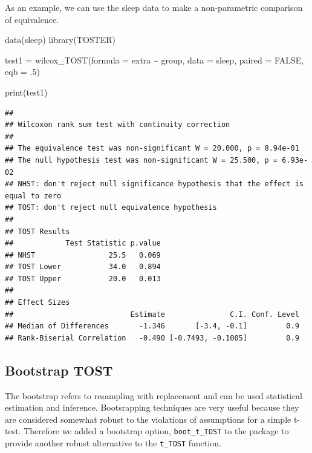 \documentclass[]{interact}
\theoremstyle{plain}%
\theoremstyle{definition}
\theoremstyle{remark}
\newenvironment{Shaded}{\begin{snugshade}}{\end{snugshade}}
\newcommand{\AttributeTok}[1]{\textcolor[rgb]{0.77,0.63,0.00}{#1}}
\newcommand{\ConstantTok}[1]{\textcolor[rgb]{0.00,0.00,0.00}{#1}}
\newcommand{\DecValTok}[1]{\textcolor[rgb]{0.00,0.00,0.81}{#1}}
\newcommand{\FunctionTok}[1]{\textcolor[rgb]{0.00,0.00,0.00}{#1}}
\newcommand{\NormalTok}[1]{#1}
\newcommand{\OtherTok}[1]{\textcolor[rgb]{0.56,0.35,0.01}{#1}}
\newcommand{\SpecialCharTok}[1]{\textcolor[rgb]{0.00,0.00,0.00}{#1}}
\newcommand{\StringTok}[1]{\textcolor[rgb]{0.31,0.60,0.02}{#1}}
\begin{document}
As an example, we can use the sleep data to make a non-parametric
comparison of equivalence.

\begin{Shaded}
\begin{Highlighting}[]
\FunctionTok{data}\NormalTok{(}\StringTok{\textquotesingle{}sleep\textquotesingle{}}\NormalTok{)}
\FunctionTok{library}\NormalTok{(TOSTER)}

\NormalTok{test1 }\OtherTok{=} \FunctionTok{wilcox\_TOST}\NormalTok{(}\AttributeTok{formula =}\NormalTok{ extra }\SpecialCharTok{\textasciitilde{}}\NormalTok{ group,}
                      \AttributeTok{data =}\NormalTok{ sleep,}
                      \AttributeTok{paired =} \ConstantTok{FALSE}\NormalTok{,}
                      \AttributeTok{eqb =}\NormalTok{ .}\DecValTok{5}\NormalTok{)}


\FunctionTok{print}\NormalTok{(test1)}
\end{Highlighting}
\end{Shaded}

\begin{verbatim}
## 
## Wilcoxon rank sum test with continuity correction
## 
## The equivalence test was non-significant W = 20.000, p = 8.94e-01
## The null hypothesis test was non-significant W = 25.500, p = 6.93e-02
## NHST: don't reject null significance hypothesis that the effect is equal to zero 
## TOST: don't reject null equivalence hypothesis
## 
## TOST Results 
##            Test Statistic p.value
## NHST                 25.5   0.069
## TOST Lower           34.0   0.894
## TOST Upper           20.0   0.013
## 
## Effect Sizes 
##                           Estimate               C.I. Conf. Level
## Median of Differences       -1.346       [-3.4, -0.1]         0.9
## Rank-Biserial Correlation   -0.490 [-0.7493, -0.1005]         0.9
\end{verbatim}

\hypertarget{bootstrap-tost}{%
\subsection{Bootstrap TOST}\label{bootstrap-tost}}

The bootstrap refers to resampling with replacement and can be used
statistical estimation and inference. Bootsrapping techniques are very
useful because they are considered somewhat robust to the violations of
assumptions for a simple t-test. Therefore we added a bootstrap option,
\texttt{boot\_t\_TOST} to the package to provide another robust
alternative to the \texttt{t\_TOST} function.
\end{document}
